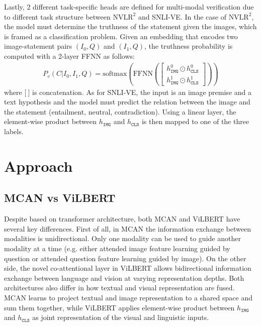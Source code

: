 \documentclass{article}
\begin{document}
Lastly, 2 different task-specific heads are defined for multi-modal verification due to different task structure between $\text{NVLR}^2$ and SNLI-VE. In the case of $\text{NVLR}^{2}$, the model must determine the truthness of the statement given the images, which is framed as a classification problem. Given an embedding that encodes two image-statement pairs $(I_{0}, Q)$ and $(I_{1}, Q)$, the truthness probability is computed with a 2-layer FFNN as follows:
\begin{align}
    P_{v}(C|I_{0}, I_{1}, Q) = \text{softmax}\left(\text{FFNN}\left(\begin{bmatrix} 
    h_{\mathtt{IMG}}^{0} \odot h_{\mathtt{CLS}}^{0} \\
    h_{\mathtt{IMG}}^{1} \odot h_{\mathtt{CLS}}^{1}
    \end{bmatrix}\right)\right)
\end{align}
where $\mathbb{[}\: \mathbb{]}$ is concatenation. As for SNLI-VE, the input is an image premise and a text hypothesis and the model must predict the relation between the image and the statement (entailment, neutral, contradiction). Using a linear layer, the element-wise product between $h_{\mathtt{IMG}}$ and $h_{\mathtt{CLS}}$ is then mapped to one of the three labels.



\section{Approach}
\subsection{MCAN vs ViLBERT}
Despite based on transformer architecture, both MCAN and ViLBERT have several key differences. First of all, in MCAN the information exchange between modalities is unidirectional. Only one modality can be used to guide another modality at a time (e.g. either attended image feature learning guided by question or attended question feature learning guided by image). On the other side, the novel co-attentional layer in ViLBERT allows bidirectional information exchange between language and vision at varying representation depths. Both architectures also differ in how textual and visual representation are fused. MCAN learns to project textual and image representation to a shared space and sum them together, while ViLBERT applies element-wise product between $h_{\mathtt{IMG}}$ and $h_{\mathtt{CLS}}$ as joint representation of the visual and linguistic inputs. 
\end{document}

